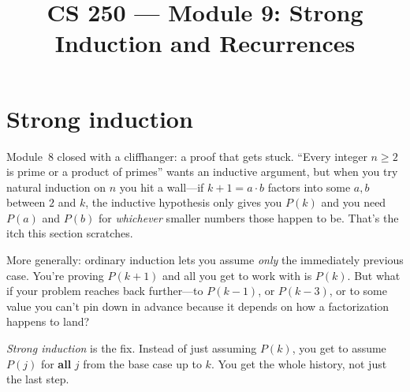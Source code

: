 \documentclass[11pt]{article}
\title{CS 250 --- Module 9: Strong Induction and Recurrences}
\author{}
\date{}
\begin{document}
\maketitle

\begin{readingmap}



\end{readingmap}

\section{Strong induction}
Module~8 closed with a cliffhanger: a proof that gets stuck. ``Every integer $n \geq 2$ is prime or a product of primes'' wants an inductive argument, but when you try natural induction on $n$ you hit a wall---if $k+1 = a \cdot b$ factors into some $a, b$ between $2$ and $k$, the inductive hypothesis only gives you $P(k)$ and you need $P(a)$ and $P(b)$ for \emph{whichever} smaller numbers those happen to be. That's the itch this section scratches.

More generally: ordinary induction lets you assume \emph{only} the immediately previous case. You're proving $P(k+1)$ and all you get to work with is $P(k)$. But what if your problem reaches back further---to $P(k-1)$, or $P(k-3)$, or to some value you can't pin down in advance because it depends on how a factorization happens to land?

\emph{Strong induction} is the fix. Instead of just assuming $P(k)$, you get to assume $P(j)$ for \textbf{all} $j$ from the base case up to $k$. You get the whole history, not just the last step.
\end{document}
